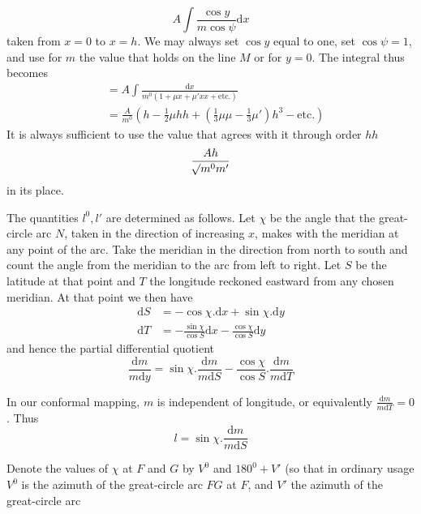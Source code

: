 %
\[
A\int\frac{\cos y}{m\cos\psi}\mathrm{d}x
\]
taken from \(x=0\) to \(x=h\). We may always set \(\cos y\) equal to one, set \(\cos\psi=1\), and use for \(m\) the value that holds on the line \(M\) or for \(y=0\). The integral thus becomes
\[
\begin{aligned}
&=A\int\frac{\mathrm{d}x}{m^0(1+\mu x+\mu'xx+\text{etc.})}\\
&=\frac{A}{m^0}(h-\tfrac{1}{2}\mu hh+(\tfrac{1}{3}\mu\mu-\tfrac{1}{3}\mu')h^3-\text{etc.})
\end{aligned}
\]
It is always sufficient to use the value that agrees with it through order \(hh\)
\[
\frac{Ah}{\mathord{{}^{}\!\surd}m^0m'}
\]
in its place.

The quantities \(l^0,l'\) are determined as follows. Let \(\chi\) be the angle that the great-circle arc \(N\), taken in the direction of increasing \(x\), makes with the meridian at any point of the arc. Take the meridian in the direction from north to south and count the angle from the meridian to the arc from left to right. Let \(S\) be the latitude at that point and \(T\) the longitude reckoned eastward from any chosen meridian. At that point we then have
\[
\begin{aligned}
\mathrm{d}S&=-\cos\chi\mathord{.}\mathrm{d}x+\sin\chi\mathord{.}\mathrm{d}y\\
\mathrm{d}T&=-\frac{\sin\chi}{\cos S}\mathrm{d}x-\frac{\cos\chi}{\cos S}\mathrm{d}y
\end{aligned}
\]
and hence the partial differential quotient
\[
\frac{\mathrm{d}m}{m\mathrm{d}y}=\sin\chi\mathord{.}\frac{\mathrm{d}m}{m\mathrm{d}S}-\frac{\cos\chi}{\cos S}\mathord{.}\frac{\mathrm{d}m}{m\mathrm{d}T}
\]

In our conformal mapping, \(m\) is independent of longitude, or equivalently \(\tfrac{\mathrm{d}m}{m\mathrm{d}T}=0\). Thus
\[
l=\sin\chi\mathord{.}\frac{\mathrm{d}m}{m\mathrm{d}S}
\]

Denote the values of \(\chi\) at \(F\) and \(G\) by \(V^0\) and \(180^0+V'\) (so that in ordinary usage \(V^0\) is the azimuth of the great-circle arc \(FG\) at \(F\), and \(V'\) the azimuth of the great-circle arc
